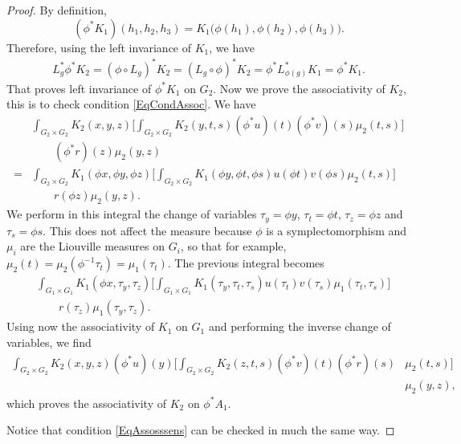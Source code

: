 \begin{proof}
	By definition,
	\[
		(\phi^*K_1)(h_1,h_2,h_3)=K_1\big( \phi(h_1),\phi(h_2),\phi(h_3)\big).
	\]
	Therefore, using the left invariance of $K_1$, we have
	\[
		\begin{split}
			L_{g}^*\phi^*K_2=(\phi\circ L_{g})^*K_2=(L_{g}\circ\phi)^*K_2=\phi^*L_{\phi(g)}^*K_1=\phi^*K_1.
		\end{split}
	\]
	That proves left invariance of $\phi^*K_1$ on $G_{2}$.  Now we prove the associativity of $K_2$, this is to check condition  \eqref{EqCondAssoc}. We have
	\[
		\begin{split}
			&\int_{G_2\times G_2}K_2(x,y,z)\Bigg[ \int_{G_2\times G_2}K_2(y,t,s)(\phi^*u)(t)(\phi^*v)(s)\mu_2(t,s) \Bigg]\\
			&\qquad(\phi^*r)(z)\mu_2(y,z)\\
			=&\int_{G_2\times G_2}K_1(\phi x,\phi y,\phi z)\Bigg[  \int_{G_2\times G_2}K_1(\phi y,\phi t,\phi s)u(\phi t)v(\phi s)\mu_2(t,s)  \Bigg]\\
			&\qquad r(\phi z)\mu_2(y,z).
		\end{split}
	\]
	We perform in this integral the change of variables $\tau_y=\phi y$, $\tau_t=\phi t$, $\tau_z=\phi z$ and $\tau_s=\phi s$. This does not affect the measure because  $\phi$ is a symplectomorphism and $\mu_i$ are the Liouville measures on $G_i$, so that for example,  $\mu_2(t)=\mu_2(\phi^{-1}\tau_t)=\mu_1(\tau_t)$. The previous integral becomes
	\[
		\begin{split}
			&\int_{G_1\times G_1}K_1(\phi x,\tau_y,\tau_z)\Bigg[  \int_{G_1\times G_1}K_1(\tau_y,\tau_t,\tau_s)u(\tau_t)v(\tau_s)\mu_1(\tau_t,\tau_s)  \Bigg]\\
			&\qquad r(\tau_z)\mu_1(\tau_y,\tau_z).
		\end{split}
	\]
	Using now the associativity of $K_1$ on $G_1$ and performing the inverse change of variables, we find
	\[
		\begin{split}
			\int_{G_2\times G_2}K_2(x,y,z)(\phi^*u)(y)\Bigg[ \int_{G_2\times G_2}K_2(z,t,s)(\phi^*v)(t)(\phi^*r)(s)&\mu_2(t,s)   \Bigg]\\
			&\mu_2(y,z),
		\end{split}
	\]
	which proves the associativity of $K_2$ on $\phi^*A_1$.

	Notice that condition \eqref{EqAssosssens} can be checked in much the same way.

\end{proof}

